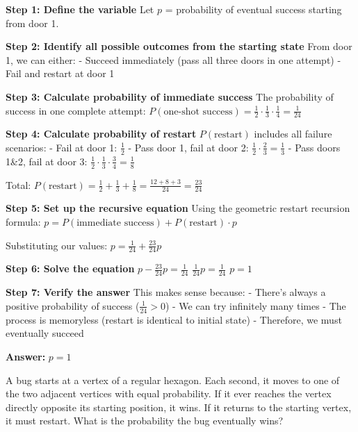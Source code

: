 \documentclass[12pt]{article}
\newenvironment{problem}[1]
{\begin{tcolorbox}[colback=blue!5!white,colframe=blue!75!black,title={#1}]}{\end{tcolorbox}}
\newenvironment{solution}
{\begin{tcolorbox}[colback=green!5!white,colframe=green!75!black,title={Solution}]}{\end{tcolorbox}}
\begin{document}
\begin{solution}
\textbf{Step 1: Define the variable}
Let $p$ = probability of eventual success starting from door 1.

\textbf{Step 2: Identify all possible outcomes from the starting state}
From door 1, we can either:
- Succeed immediately (pass all three doors in one attempt)
- Fail and restart at door 1

\textbf{Step 3: Calculate probability of immediate success}
The probability of success in one complete attempt:
$P(\text{one-shot success}) = \frac{1}{2} \cdot \frac{1}{3} \cdot \frac{1}{4} = \frac{1}{24}$

\textbf{Step 4: Calculate probability of restart}
$P(\text{restart})$ includes all failure scenarios:
- Fail at door 1: $\frac{1}{2}$
- Pass door 1, fail at door 2: $\frac{1}{2} \cdot \frac{2}{3} = \frac{1}{3}$
- Pass doors 1\&2, fail at door 3: $\frac{1}{2} \cdot \frac{1}{3} \cdot \frac{3}{4} = \frac{1}{8}$

Total: $P(\text{restart}) = \frac{1}{2} + \frac{1}{3} + \frac{1}{8} = \frac{12 + 8 + 3}{24} = \frac{23}{24}$

\textbf{Step 5: Set up the recursive equation}
Using the geometric restart recursion formula:
$p = P(\text{immediate success}) + P(\text{restart}) \cdot p$

Substituting our values:
$p = \frac{1}{24} + \frac{23}{24}p$

\textbf{Step 6: Solve the equation}
$p - \frac{23}{24}p = \frac{1}{24}$
$\frac{1}{24}p = \frac{1}{24}$
$p = 1$

\textbf{Step 7: Verify the answer}
This makes sense because:
- There's always a positive probability of success ($\frac{1}{24} > 0$)
- We can try infinitely many times
- The process is memoryless (restart is identical to initial state)
- Therefore, we must eventually succeed

\textbf{Answer:} $p = 1$
\end{solution}

\begin{problem}{AMC 12 Style: Bug on Hexagon}
A bug starts at a vertex of a regular hexagon. Each second, it moves to one of the two adjacent vertices with equal probability. If it ever reaches the vertex directly opposite its starting position, it wins. If it returns to the starting vertex, it must restart. What is the probability the bug eventually wins?
\end{problem}
\end{document}
